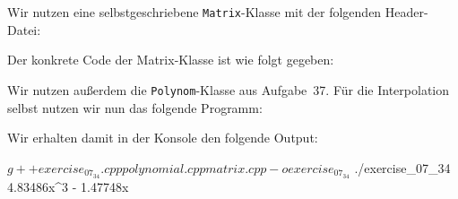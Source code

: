 \section{}

Wir nutzen eine selbstgeschriebene \texttt{Matrix}-Klasse mit der folgenden Header-Datei:



Der konkrete Code der Matrix-Klasse ist wie folgt gegeben:



Wir nutzen außerdem die \texttt{Polynom}-Klasse aus Aufgabe~37.
Für die Interpolation selbst nutzen wir nun das folgende Programm:



Wir erhalten damit in der Konsole den folgende Output:

\begin{consoleoutput}
$ g++ exercise_07_34.cpp polynomial.cpp matrix.cpp -o exercise_07_34 
$ ./exercise_07_34 
4.83486x^3 - 1.47748x
\end{consoleoutput}
